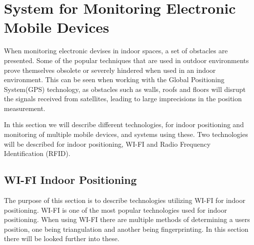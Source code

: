 \section{System for Monitoring Electronic Mobile Devices}\label{sec:monitoring}
When monitoring electronic devises in indoor spaces, a set of obstacles are presented. Some of the popular techniques that are used in outdoor environments prove themselves obsolete or severely hindered when used in an indoor environment.  This can be seen when working with the Global Positioning System(GPS) technology, as obstacles such as walls, roofs and floors will disrupt the signals received from satellites, leading to large imprecisions in the position measurement.

In this section we will describe different technologies, for indoor positioning and monitoring of multiple mobile devices, and systems using these. Two technologies will be described for indoor positioning, WI-FI and Radio Frequency Identification (RFID).

\subsection{WI-FI Indoor Positioning}
The purpose of this section is to describe technologies utilizing WI-FI for indoor positioning. WI-FI is one of the most popular technologies used for indoor positioning. When using WI-FI there are multiple methods of determining a users position, one being triangulation and another being fingerprinting. In this section there will be looked further into these. 


